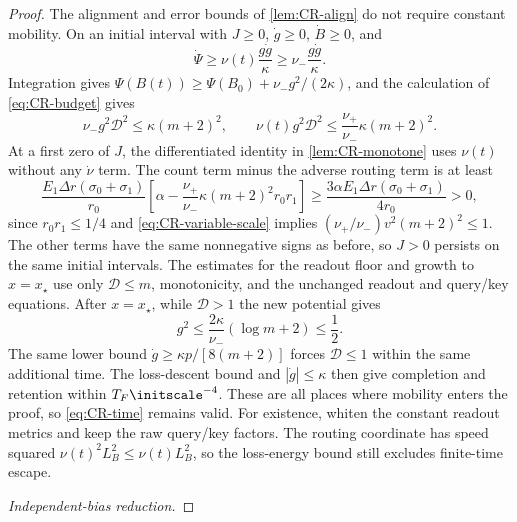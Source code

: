 \begin{proof}
The alignment and error bounds of \cref{lem:CR-align} do not require constant mobility.
On an initial interval with $J\ge0$, $\dot g\ge0$, $\dot B\ge0$, and
\[
 \dot \Psi\ge\nu(t)\frac{g\dot g}{\kappa}\ge\nu_-\frac{g\dot g}{\kappa}.
\]
Integration gives $\Psi(B(t))\ge \Psi(B_0)+\nu_-g^2/(2\kappa)$, and the calculation of \cref{eq:CR-budget} gives
\begin{equation}
 \nu_-g^2\mathcal D^2\le\kappa(m+2)^2,\qquad
 \nu(t)g^2\mathcal D^2\le\frac{\nu_+}{\nu_-}\kappa(m+2)^2.
 \label{eq:CR-variable-budget}
\end{equation}
At a first zero of $J$, the differentiated identity in \cref{lem:CR-monotone} uses $\nu(t)$ without any $\dot\nu$ term.
The count term minus the adverse routing term is at least
\[
 \frac{E_1\Delta r(\sigma_0+\sigma_1)}{r_0}
 \left[\alpha-\frac{\nu_+}{\nu_-}\kappa(m+2)^2r_0r_1\right]
 \ge\frac{3\alpha E_1\Delta r(\sigma_0+\sigma_1)}{4r_0}>0,
\]
since $r_0r_1\le1/4$ and \cref{eq:CR-variable-scale} implies
$(\nu_+/\nu_-)v^2(m+2)^2\le1$.
The other terms have the same nonnegative signs as before, so $J>0$ persists on the same initial intervals.
The estimates for the readout floor and growth to $x=x_\star$ use only $\mathcal D\le m$, monotonicity, and the unchanged readout and query/key equations.
After $x=x_\star$, while $\mathcal D>1$ the new potential gives
\[
 g^2\le\frac{2\kappa}{\nu_-}(\log m+2)\le\frac12.
\]
The same lower bound $\dot g\ge\kappa p/[8(m+2)]$ forces $\mathcal D\le1$ within the same additional time.
The loss-descent bound and $|\dot g|\le\kappa$ then give completion and retention within $T_F\initscale^{-4}$.
These are all places where mobility enters the proof, so \cref{eq:CR-time} remains valid.
For existence, whiten the constant readout metrics and keep the raw query/key factors. The routing coordinate has speed squared
$\nu(t)^2L_B^2\le\nu(t)L_B^2$, so the loss-energy bound still excludes finite-time escape.

\emph{Independent-bias reduction.}


\end{proof}
